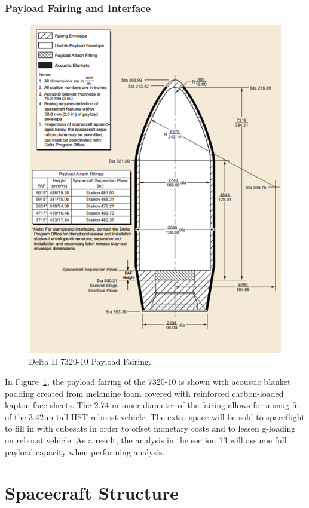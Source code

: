 \documentclass[paper=letter, fontsize=11pt]{scrartcl} %
\numberwithin{equation}{section} %
\numberwithin{figure}{section} %
\numberwithin{table}{section} %
\begin{document}
\subsubsection{Payload Fairing and Interface}
\begin{figure}[H]
\centering
\includegraphics[width=.75\textwidth]{12-3.png}
\caption{Delta II 7320-10 Payload Fairing.}
\label{L3}
\end{figure}

In Figure~\ref{L3}, the payload fairing of the 7320-10 is shown with acoustic blanket padding created from melamine foam covered with reinforced carbon-loaded kapton face sheets. The 2.74 m inner diameter of the fairing allows for a snug fit of the 3.42 m tall HST reboost vehicle. The extra space will be sold to spaceflight to fill in with cubesats in order to offset monetary costs and to lessen g-loading on reboost vehicle. As a result, the analysis in the section 13 will assume full payload capacity when performing analysis.


\section{Spacecraft Structure} \label{section:structure}
\end{document}
